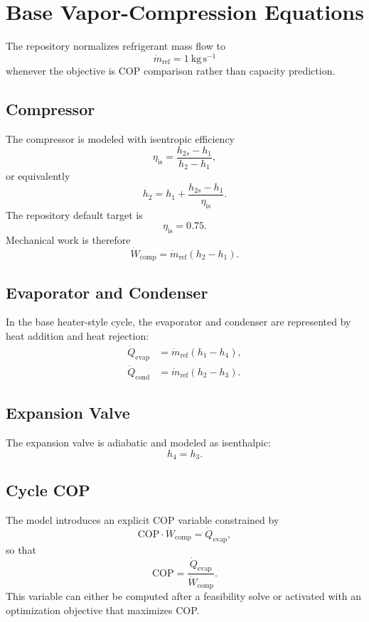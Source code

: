 \documentclass[11pt]{article}
\begin{document}
\section{Base Vapor-Compression Equations}
The repository normalizes refrigerant mass flow to
\begin{equation}
\dot{m}_{\mathrm{ref}} = 1~\mathrm{kg\,s^{-1}}
\end{equation}
whenever the objective is COP comparison rather than capacity prediction.

\subsection{Compressor}
The compressor is modeled with isentropic efficiency
\begin{equation}
\eta_{\mathrm{is}}
=
\frac{h_{2s}-h_1}{h_2-h_1},
\end{equation}
or equivalently
\begin{equation}
h_2 = h_1 + \frac{h_{2s}-h_1}{\eta_{\mathrm{is}}}.
\end{equation}
The repository default target is
\begin{equation}
\eta_{\mathrm{is}} = 0.75.
\end{equation}
Mechanical work is therefore
\begin{equation}
\dot{W}_{\mathrm{comp}} = \dot{m}_{\mathrm{ref}}(h_2-h_1).
\end{equation}

\subsection{Evaporator and Condenser}
In the base heater-style cycle, the evaporator and condenser are represented by heat addition and heat rejection:
\begin{align}
\dot{Q}_{\mathrm{evap}} &= \dot{m}_{\mathrm{ref}}(h_1-h_4), \\
\dot{Q}_{\mathrm{cond}} &= \dot{m}_{\mathrm{ref}}(h_2-h_3).
\end{align}

\subsection{Expansion Valve}
The expansion valve is adiabatic and modeled as isenthalpic:
\begin{equation}
h_4 = h_3.
\end{equation}

\subsection{Cycle COP}
The model introduces an explicit COP variable constrained by
\begin{equation}
\mathrm{COP} \cdot \dot{W}_{\mathrm{comp}} = \dot{Q}_{\mathrm{evap}},
\end{equation}
so that
\begin{equation}
\mathrm{COP} = \frac{\dot{Q}_{\mathrm{evap}}}{\dot{W}_{\mathrm{comp}}}.
\end{equation}
This variable can either be computed after a feasibility solve or activated with an optimization objective that maximizes COP.
\end{document}
